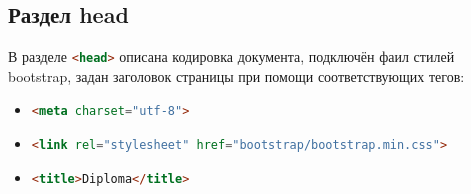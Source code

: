 \subsection{Раздел head}
В разделе \lstinline[language=HTML]{<head>} описана кодировка документа, подключён фаил стилей bootstrap, задан заголовок страницы при помощи соответствующих тегов:
\begin{itemize}
	\item \lstinline[language=HTML]{<meta charset="utf-8">}
	\item \lstinline[language=HTML]{<link rel="stylesheet" href="bootstrap/bootstrap.min.css">}
	\item \lstinline[language=HTML]{<title>Diploma</title>}
\end{itemize}